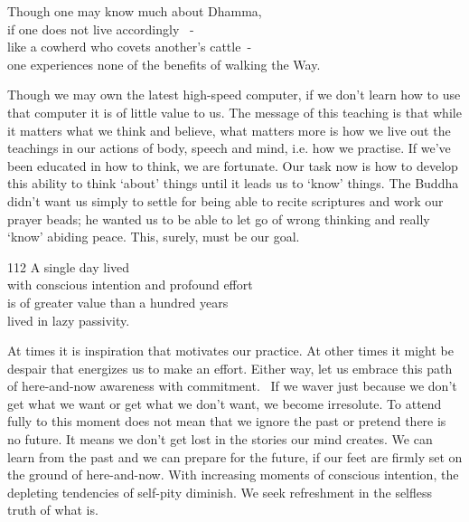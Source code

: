 
\begin{dhpVerse}{19}
\label{dhp-19}
Though one may know much about Dhamma,\\
if one does not live accordingly  -\\
like a cowherd who covets another's cattle -\\
one experiences none of the benefits of walking the Way.
\end{dhpVerse}

\begin{dhpRefl}
Though we may own the latest high-speed computer, if we don't learn how to use that computer it is of little value to us. The message of this teaching is that while it matters what we think and believe, what matters more is how we live out the teachings in our actions of body, speech and mind, i.e. how we practise. If we've been educated in how to think, we are fortunate. Our task now is how to develop this ability to think `about' things until it leads us to `know' things. The Buddha didn't want us simply to settle for being able to recite scriptures and work our prayer beads; he wanted us to be able to let go of wrong thinking and really `know' abiding peace. This, surely, must be our goal.
\end{dhpRefl}


\begin{dhpVerse}{112}
\label{dhp-112}
A single day lived\\
with conscious intention and profound effort\\
is of greater value than a hundred years\\
lived in lazy passivity.
\end{dhpVerse}

\begin{dhpRefl}
At times it is inspiration that motivates our practice. At other times it might be despair that energizes us to make an effort. Either way, let us embrace this path of here-and-now awareness with commitment.  If we waver just because we don't get what we want or get what we don't want, we become irresolute. To attend fully to this moment does not mean that we ignore the past or pretend there is no future. It means we don't get lost in the stories our mind creates. We can learn from the past and we can prepare for the future, if our feet are firmly set on the ground of here-and-now. With increasing moments of conscious intention, the depleting tendencies of self-pity diminish. We seek refreshment in the selfless truth of what is.
\end{dhpRefl}

